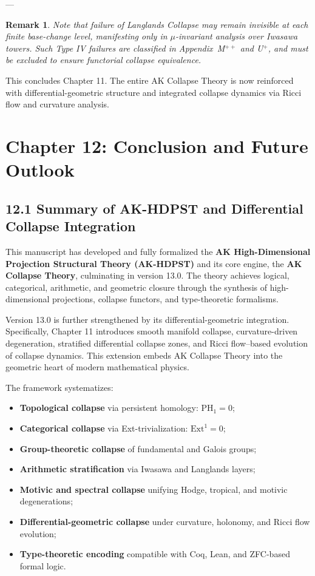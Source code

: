 \documentclass[11pt]{article}
\newtheorem{remark}[theorem]{Remark}
\begin{document}
---

\begin{remark}
Note that failure of Langlands Collapse may remain invisible at each finite base-change level, manifesting only in $\mu$-invariant analysis over Iwasawa towers.
Such Type IV failures are classified in Appendix~M$^{++}$ and U$^+$, and must be excluded to ensure functorial collapse equivalence.
\end{remark}

\noindent This concludes Chapter 11. The entire AK Collapse Theory is now reinforced with differential-geometric structure and integrated collapse dynamics via Ricci flow and curvature analysis.



\section{Chapter 12: Conclusion and Future Outlook}

\subsection*{12.1 Summary of AK-HDPST and Differential Collapse Integration}

This manuscript has developed and fully formalized the \textbf{AK High-Dimensional Projection Structural Theory (AK-HDPST)} and its core engine, the \textbf{AK Collapse Theory}, culminating in version 13.0. The theory achieves logical, categorical, arithmetic, and geometric closure through the synthesis of high-dimensional projections, collapse functors, and type-theoretic formalisms.

Version 13.0 is further strengthened by its differential-geometric integration. Specifically, Chapter 11 introduces smooth manifold collapse, curvature-driven degeneration, stratified differential collapse zones, and Ricci flow–based evolution of collapse dynamics. This extension embeds AK Collapse Theory into the geometric heart of modern mathematical physics.

The framework systematizes:
\begin{itemize}
    \item \textbf{Topological collapse} via persistent homology: \( \mathrm{PH}_1 = 0 \);
    \item \textbf{Categorical collapse} via Ext-trivialization: \( \mathrm{Ext}^1 = 0 \);
    \item \textbf{Group-theoretic collapse} of fundamental and Galois groups;
    \item \textbf{Arithmetic stratification} via Iwasawa and Langlands layers;
    \item \textbf{Motivic and spectral collapse} unifying Hodge, tropical, and motivic degenerations;
    \item \textbf{Differential-geometric collapse} under curvature, holonomy, and Ricci flow evolution;
    \item \textbf{Type-theoretic encoding} compatible with Coq, Lean, and ZFC-based formal logic.
\end{itemize}
\end{document}
